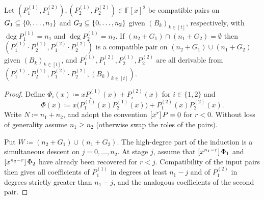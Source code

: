 \begin{lemma}
    Let $(P^{(1)}_1, P^{(2)}_1), (P^{(1)}_2, P^{(2)}_2) \in \mathbb{F}[x]^2$ be compatible pairs on $G_1 \subseteq \idx{n_1}$ and $G_2 \subseteq \idx{n_2}$ given $(B_k)_{k \in [t]}$, respectively, with $\deg P^{(1)}_1 = n_1$ and $\deg P^{(1)}_2 = n_2$.
    If $(n_2 + G_1) \cap (n_1 + G_2) = \emptyset$ then $(P^{(1)}_1 \cdot P^{(1)}_2, P^{(2)}_1 \cdot P^{(2)}_2)$ is a compatible pair on $(n_2 + G_1) \cup (n_1 + G_2)$ given $(B_k)_{k \in [t]}$, and $P^{(1)}_1, P^{(2)}_1, P^{(1)}_2, P^{(2)}_2$ are all derivable from $(P^{(1)}_1 \cdot P^{(1)}_2, P^{(2)}_1 \cdot P^{(2)}_2, (B_k)_{k \in [t]})$.
\end{lemma}
\begin{proof}
    Define $\Phi_i(x)\coloneqq xP^{(1)}_i(x)+P^{(2)}_i(x)$ for $i\in\{1,2\}$ and
    \[
        \Phi(x)\coloneqq x\bigl(P^{(1)}_1(x)P^{(1)}_2(x)\bigr)+P^{(2)}_1(x)P^{(2)}_2(x).
    \]
    Write $N\coloneqq n_1+n_2$, and adopt the convention $\coeff{P}{r}=0$ for $r<0$.
    Without loss of generality assume $n_1\ge n_2$ (otherwise swap the roles of the pairs).

    Put $W\coloneqq(n_2+G_1)\cup(n_1+G_2)$.  The high-degree part of the
    induction is a simultaneous descent on $j=0,\ldots,n_2$.  At stage $j$,
    assume that $\coeff{\Phi_1}{n_1-r}$ and $\coeff{\Phi_2}{n_2-r}$ have
    already been recovered for $r<j$.  Compatibility of the input pairs then
    gives all coefficients of $P^{(1)}_1$ in degrees at least $n_1-j$ and
    of $P^{(2)}_1$ in degrees strictly greater than $n_1-j$, and the
    analogous coefficients of the second pair.


\end{proof}
